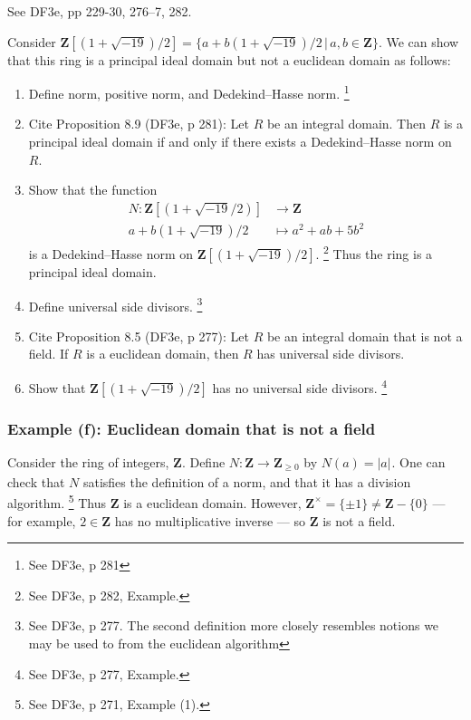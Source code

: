 \documentclass[oneside, english, 11pt]{article}
\newcommand{\abs}[2][]{\left|#2\right|_{#1}}
\newcommand{\integers}{\mathbf{Z}}
\newcommand{\integersNonnegative}{\integers_{\geq 0}}
\renewcommand{\setminus}{-}
\newcommand{\st}{\,|\,}
\newcommand{\Z}{\integers}
\begin{document}
{See DF3e, pp 229-30, 276--7, 282.

Consider $\Z[(1 + \sqrt{-19}) / 2] = \{a + b (1 + \sqrt{-19}) / 2 \st a, b \in \Z\}$. We can show that this ring is a principal ideal domain but not a euclidean domain as follows:
\begin{enumerate}
\item Define norm, positive norm, and Dedekind--Hasse norm.%
\footnote{See DF3e, p 281}%
\item Cite Proposition 8.9 (DF3e, p 281): Let $R$ be an integral domain. Then $R$ is a principal ideal domain if and only if there exists a Dedekind--Hasse norm on $R$.
\item Show that the function
\begin{align*}
N : \Z[(1 + \sqrt{-19} / 2)]
&\rightarrow
\Z
\\
a + b (1 + \sqrt{-19}) / 2
&\mapsto
a^{2} + a b + 5 b^{2}
\end{align*}
is a Dedekind--Hasse norm on $\Z[(1 + \sqrt{-19}) / 2]$.%
\footnote{See DF3e, p 282, Example.} %
Thus the ring is a principal ideal domain.
\item Define universal side divisors.%
\footnote{See DF3e, p 277. The second definition more closely resembles notions we may be used to from the euclidean algorithm}%
\item Cite Proposition 8.5 (DF3e, p 277): Let $R$ be an integral domain that is not a field. If $R$ is a euclidean domain, then $R$ has universal side divisors.
\item Show that $\Z[(1 + \sqrt{-19}) / 2]$ has no universal side divisors.%
\footnote{See DF3e, p 277, Example.}%
\end{enumerate}



\subsubsection*{Example (f): Euclidean domain that is not a field}

Consider the ring of integers, $\Z$. Define $N : \Z \rightarrow \integersNonnegative$ by $N(a) = \abs{a}$. One can check that $N$ satisfies the definition of a norm, and that it has a division algorithm.%
\footnote{See DF3e, p 271, Example (1).} %
Thus $\Z$ is a euclidean domain. However, $\Z^{\times} = \{\pm 1\} \neq \Z \setminus \{0\}$ --- for example, $2 \in \Z$ has no multiplicative inverse --- so $\Z$ is not a field.

}
\end{document}
